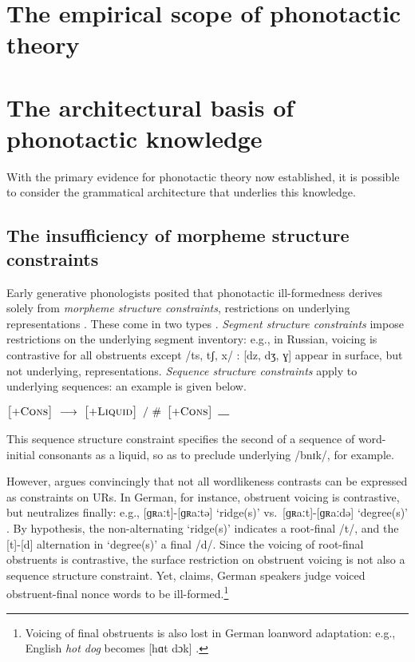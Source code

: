 \section{The empirical scope of phonotactic theory}

\section{The architectural basis of phonotactic knowledge}

With the primary evidence for phonotactic theory now established, it is possible to consider the grammatical architecture that underlies this knowledge.

\subsection{The insufficiency of morpheme structure constraints}

Early generative phonologists posited that phonotactic ill-formedness derives solely from \emph{morpheme structure constraints}, restrictions on underlying representations \citep[e.g.,][]{Chomsky1966,SPE,SPR,Halle1962}.
These come in two types \citep{Stanley1967}.
\emph{Segment structure constraints} impose restrictions on the underlying segment inventory: e.g., in Russian, voicing is contrastive for all obstruents except /ts, tʃ, x/ \citep[22]{SPR}: [dz, dʒ, ɣ] appear in surface, but not underlying, representations.
\emph{Sequence structure constraints} apply to underlying sequences: an example is given below.

\begin{example}
$\begin{bmatrix} +\textsc{Cons} \end{bmatrix}~\goesto~\begin{bmatrix} +\textsc{Liquid} \end{bmatrix}~/~\#~\begin{bmatrix} +\textsc{Cons} \end{bmatrix}~\gap$
\end{example}

\noindent
This sequence structure constraint specifies the second of a sequence of word-initial consonants as a liquid, so as to preclude underlying /bnɪk/, for example. 

However, \citet{Shibatani1973} argues convincingly that not all wordlikeness contrasts can be expressed as constraints on URs.
In German, for instance, obstruent voicing is contrastive, but neutralizes finally: e.g., [ɡʀaːt]-[ɡʀaːtə] `ridge(s)' vs.~[ɡʀaːt]-[ɡʀaːdə] `degree(s)'
.
By hypothesis, the non-alternating `ridge(s)' indicates a root-final /t/, and the [t]-[d] alternation in `degree(s)' a final /d/. 
Since the voicing of root-final obstruents is contrastive, the surface restriction on obstruent voicing is not also a sequence structure constraint.
Yet, \citeauthor{Shibatani1973} claims, German speakers judge voiced obstruent-final nonce words to be ill-formed.\footnote{
    Voicing of final obstruents is also lost in German loanword adaptation: e.g., English \emph{hot dog} becomes [hɑt dɔk] \cite[506]{Ussishkin2003}.}

